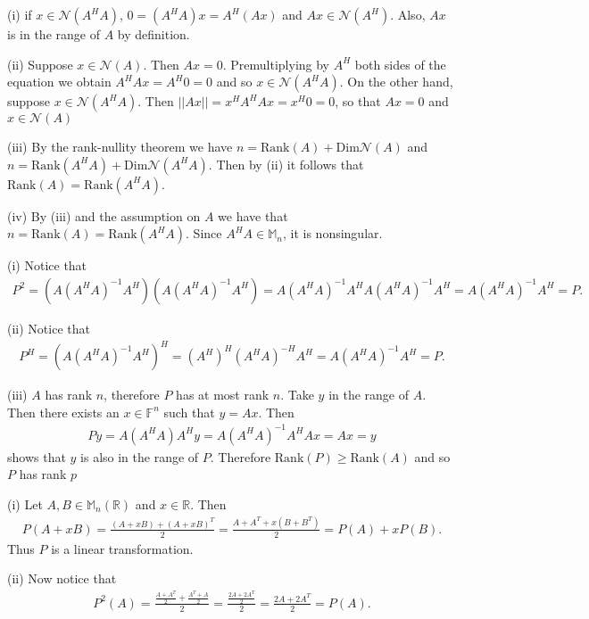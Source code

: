 \documentclass[letterpaper,12pt]{article}
\theoremstyle{definition}
\newenvironment{problem}[2][Problem]{\begin{trivlist}
\item[\hskip \labelsep {\bfseries #1}\hskip \labelsep {\bfseries #2.}]}{\end{trivlist}}
\begin{document}
\begin{problem}{45}
\end{problem} \begin{problem}{46}
(i)
if $x\in\mathcal N(A^HA)$, $0=(A^HA)x=A^H(Ax)$ and $Ax\in\mathcal N(A^H)$.
Also, $Ax$ is in the range of $A$ by definition.

(ii)
Suppose $x\in\mathcal N(A)$.
Then $Ax=0$.
Premultiplying by $A^H$ both sides of the equation we obtain $A^HAx=A^H0=0$
and so $x\in\mathcal N(A^HA)$.
On the other hand, suppose $x\in\mathcal N(A^HA)$.
Then $||Ax||=x^HA^HAx=x^H0=0$, so that $Ax=0$ and $x\in\mathcal N(A)$

(iii)
By the rank-nullity theorem we have $n=\text{Rank}(A)+\text{Dim}\mathcal N(A)$
and $n=\text{Rank}(A^HA)+\text{Dim}\mathcal N(A^HA)$.
Then by (ii) it follows that $\text{Rank}(A)=\text{Rank}(A^HA)$.

(iv)
By (iii) and the assumption on $A$ we have that $n=\text{Rank}(A)=\text{Rank}(A^HA)$.
Since $A^HA\in\mathbb M_n$, it is nonsingular.

\end{problem} \begin{problem}{47}
(i)
Notice that
\begin{align*}
    P^2=(A(A^HA)^{-1}A^H)(A(A^HA)^{-1}A^H)=
    A(A^HA)^{-1}A^HA(A^HA)^{-1}A^H=
    A(A^HA)^{-1}A^H=P.
\end{align*}

(ii)
Notice that
\begin{align*}
    P^H=(A(A^HA)^{-1}A^H)^H=
    (A^H)^H(A^HA)^{-H}A^H=A(A^HA)^{-1}A^H=P.
\end{align*}

(iii)
$A$ has rank $n$, therefore $P$ has at most rank $n$.
Take $y$ in the range of $A$.
Then there exists an $x\in\mathbb F^n$ such that $y=Ax$.
Then
\begin{align*}
    Py=A(A^HA)A^Hy=A(A^HA)^{-1}A^HAx=Ax=y
\end{align*}
shows that $y$ is also in the range of $P$.
Therefore $\text{Rank}(P)\geq\text{Rank}(A)$ and so $P$ has rank $p$

\end{problem} \begin{problem}{48}
(i)
Let $A,B\in\mathbb M_n(\mathbb R)$ and $x\in\mathbb R$.
Then
\begin{align*}
    P(A+xB)=\frac{(A+xB)+(A+xB)^T}{2}=
    \frac{A+A^T+x(B+B^T)}{2}=P(A)+xP(B).
\end{align*}
Thus $P$ is a linear transformation.

(ii)
Now notice that
\begin{align*}
    P^2(A)=\frac{\frac{A+A^T}{2}+\frac{A^T+A}{2}}{2}=
    \frac{\frac{2A+2A^T}{2}}{2}=\frac{2A+2A^T}{2}=P(A).
\end{align*}


\end{problem}
\end{document}

